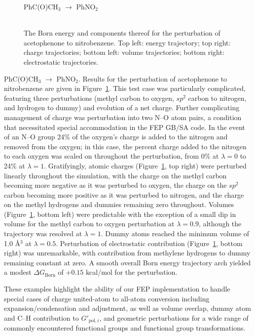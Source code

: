 \documentclass[12pt]{report}
\def\figlab{Figure}\def\figslab{\figlab s}
\newcommand*\fig[1]{\figlab~\ref{#1}}
\begin{document}
\begin{figure}[t!]
\centering
PhC(O)CH$_3$  $\longrightarrow$ PhNO$_2$\\
\hspace*{-1.3cm}\\
\hspace*{-1.3cm}
\caption{The Born energy and components thereof for the perturbation of acetophenone to nitrobenzene. Top left: energy trajectory; top right: charge trajectories; bottom left: volume trajectories; bottom right: electrostatic trajectories.}
\label{no2}
\end{figure}

PhC(O)CH$_3$  $\longrightarrow$ PhNO$_2$. Results for the perturbation of acetophenone to nitrobenzene are given in \fig{no2}. This test case was particularly complicated, featuring three perturbations (methyl carbon to oxygen, $sp^2$ carbon to nitrogen, and hydrogen to dummy) and evolution of a net charge. Further complicating management of charge was perturbation into two N--O atom pairs, a condition that necessitated special accommodation in the FEP GB/SA code. In the event of an N--O group 24\% of the oxygen's charge is added to the nitrogen and removed from the oxygen; in this case, the percent charge added to the nitrogen to each oxygen was scaled on throughout the perturbation, from 0\% at $\lambda = 0$ to 24\% at $\lambda = 1$. Gratifyingly, atomic charges (\fig{no2}, top right) were perturbed linearly throughout the simulation, with the charge on the methyl carbon becoming more negative as it was perturbed to oxygen, the charge on the $sp^2$ carbon becoming more positive as it was perturbed to nitrogen, and the charge on the methyl hydrogens and dummies remaining zero throughout. Volumes (\fig{no2}, bottom left) were predictable with the exception of a small dip in volume for the methyl carbon to oxygen perturbation at $\lambda = 0.9$, although the trajectory was resolved at $\lambda = 1$. Dummy atoms reached the minimum volume of 1.0 \AA$^3$ at $\lambda = 0.5$. Perturbation of electrostatic contribution (\fig{no2}, bottom right) was unremarkable, with contribution from methylene hydrogens to dummy remaining constant at zero. A smooth overall Born energy trajectory arch yielded a modest $\Delta G_{ \textrm{Born}}$ of $+0.15$ kcal/mol for the perturbation. 

These examples highlight the ability of our FEP implementation to handle special cases of charge united-atom to all-atom conversion including expansion/condensation and adjustment, as well as volume overlap, dummy atom and C--H contribution to $G'_{ \textrm{pol},i}$, and geometric perturbations for a wide range of commonly encountered functional groups and functional group transformations.
\end{document}
